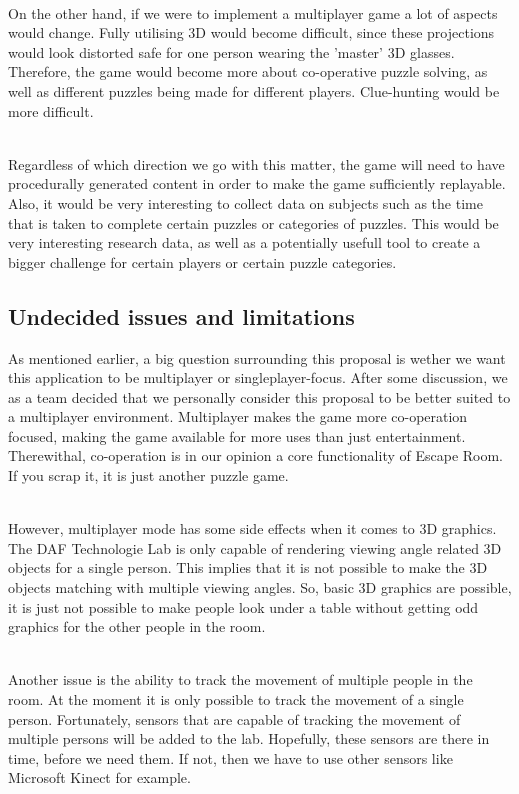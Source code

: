 \documentclass[11pt]{article}
\begin{document}
~\\
On the other hand, if we were to implement a multiplayer game a lot of aspects would change. Fully utilising 3D would become difficult, since these projections would look distorted safe for one person wearing the 'master' 3D glasses. Therefore, the game would become more about co-operative puzzle solving, as well as different puzzles being made for different players. Clue-hunting would be more difficult.

~\\
Regardless of which direction we go with this matter, the game will need to have procedurally generated content in order to make the game sufficiently replayable. Also, it would be very interesting to collect data on subjects such as the time that is taken to complete certain puzzles or categories of puzzles. This would be very interesting research data, as well as a potentially usefull tool to create a bigger challenge for certain players or certain puzzle categories.


\newpage
{}
\subsection*{Undecided issues and limitations}
As mentioned earlier, a big question surrounding this proposal is wether we want this application to be multiplayer or singleplayer-focus. After some discussion, we as a team decided that we personally consider this proposal to be better suited to a multiplayer environment. Multiplayer makes the game more co-operation focused, making the game available for more uses than just entertainment. Therewithal, co-operation is in our opinion a core functionality of Escape Room. If you scrap it, it is just another puzzle game. 

~\\
However, multiplayer mode has some side effects when it comes to 3D graphics. The DAF Technologie Lab is only capable of rendering viewing angle related 3D objects for a single person. This implies that it is not possible to make the 3D objects matching with multiple viewing angles. So, basic 3D graphics are possible, it is just not possible to make people look under a table without getting odd graphics for the other people in the room. 

~\\
Another issue is the ability to track the movement of multiple people in the room. At the moment it is only possible to track the movement of a single person. Fortunately, sensors that are capable of tracking the movement of multiple persons will be added to the lab. Hopefully, these sensors are there in time, before we need them. If not, then we have to use other sensors like Microsoft Kinect for example. 
\end{document}

